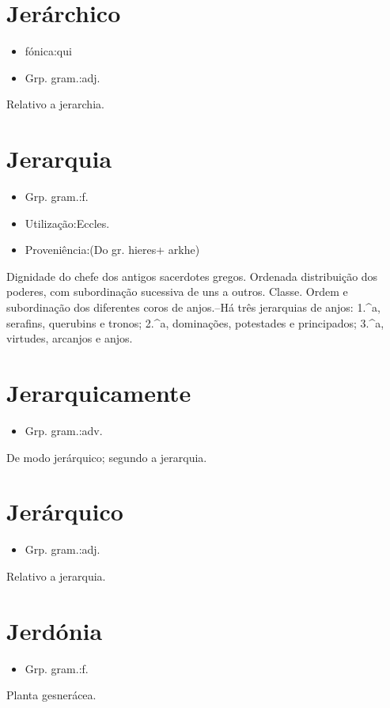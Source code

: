 \documentclass{article}
\begin{document}
\section{Jerárchico}
\begin{itemize}
\item {fónica:qui}
\end{itemize}
\begin{itemize}
\item {Grp. gram.:adj.}
\end{itemize}
Relativo a jerarchia.
\section{Jerarquia}
\begin{itemize}
\item {Grp. gram.:f.}
\end{itemize}
\begin{itemize}
\item {Utilização:Eccles.}
\end{itemize}
\begin{itemize}
\item {Proveniência:(Do gr. \textunderscore hieres\textunderscore  + \textunderscore arkhe\textunderscore )}
\end{itemize}
Dignidade do chefe dos antigos sacerdotes gregos.
Ordenada distribuição dos poderes, com subordinação sucessiva de uns a outros.
Classe.
Ordem e subordinação dos diferentes coros de anjos.--Há três jerarquias de anjos: 1.^a, serafins, querubins e tronos; 2.^a, dominações, potestades e principados; 3.^a, virtudes, arcanjos e anjos.
\section{Jerarquicamente}
\begin{itemize}
\item {Grp. gram.:adv.}
\end{itemize}
De modo jerárquico; segundo a jerarquia.
\section{Jerárquico}
\begin{itemize}
\item {Grp. gram.:adj.}
\end{itemize}
Relativo a jerarquia.
\section{Jerdónia}
\begin{itemize}
\item {Grp. gram.:f.}
\end{itemize}
Planta gesnerácea.
\end{document}
